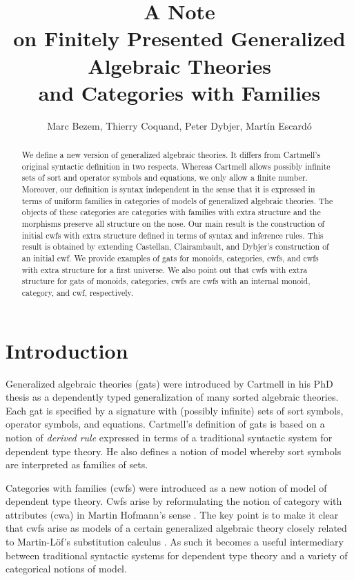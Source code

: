 \documentclass{lmcs}
\title[Generalized Algebraic Theories and Categories with Families]{A Note\\ on Finitely Presented Generalized Algebraic Theories\\and Categories with Families}\author{Marc Bezem, Thierry Coquand, Peter Dybjer, Mart\'in Escard\'o}
\begin{document}
\maketitle

\begin{abstract}
We define a new version of generalized algebraic theories. It differs from Cartmell's original syntactic definition in two respects. Whereas Cartmell allows possibly infinite sets of sort and operator symbols and equations, we only allow a finite number. Moreover, our definition is syntax independent in the sense that it is expressed in terms of uniform families in categories of models of generalized algebraic theories. 
The objects of these categories are categories with families with extra structure and the morphisms preserve all structure on the nose. Our main result is the construction of initial cwfs with extra structure defined in terms of syntax and inference rules. This result is obtained by extending Castellan, Clairambault, and Dybjer's construction of an initial cwf. We provide examples of gats for monoids, categories, cwfs, and cwfs with extra structure for a first universe. We also point out that cwfs with extra structure for  gats of monoids, categories, cwfs are cwfs with an internal monoid, category, and cwf, respectively.
\end{abstract}

\section{Introduction}

Generalized algebraic theories (gats) were introduced by Cartmell in his PhD thesis \cite{cartmell:phd} as a dependently typed generalization of many sorted algebraic theories. Each gat is specified by a signature with (possibly infinite) sets of sort symbols, operator symbols, and equations. Cartmell's definition of gats \cite{cartmell:phd,cartmell:apal} is based on a notion of {\em derived rule} expressed in terms of a traditional syntactic system for dependent type theory. He also defines a notion of model whereby sort symbols are interpreted as families of sets.

Categories with families (cwfs) \cite{dybjer:torino} were introduced as a new notion of model of dependent type theory. Cwfs arise by reformulating the notion of category with attributes (cwa) in Martin Hofmann's sense \cite{hofmann:csl}. The key point is to make it clear that cwfs arise as models of a certain generalized algebraic theory closely related to Martin-Löf's substitution calculus \cite{martinlof:gbg92}. As such it becomes a useful intermediary between traditional syntactic systems for dependent type theory and a variety of categorical notions of model.
\end{document}
